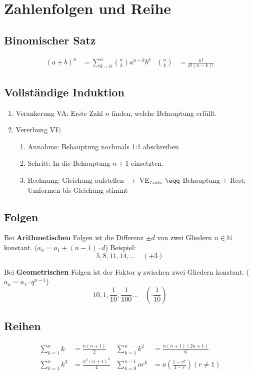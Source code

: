 \section{Zahlenfolgen und Reihe}

\subsection{Binomischer Satz }
\begin{align*}
	(a+b)^n &= \sum_{k=0}^n \binom{n}{k} a^{n-k} b^k
	&
	\binom{n}{k} &= \frac{n!}{k!(n-k)!}
\end{align*}

\subsection{Vollständige Induktion}\label{induktion}
\begin{enumerate}[nosep]
	\item Verankerung VA: Erste Zahl $n$ finden, welche Behauptung erfüllt.
	\item Vererbung VE:
	\begin{enumerate}
		\item Annahme: Behauptung nochmals 1:1 abschreiben
		\item Schritt: In die Behauptung $n+1$ einsetzten.
		\item Rechnung: Gleichung aufstellen $\rightarrow$ VE$_{Links}$ $\eqq$ Behauptung + Rest; Umformen bis Gleichung stimmt
	\end{enumerate}

\end{enumerate}

\subsection{Folgen}
\noindent Bei \textbf{Arithmetischen} Folgen ist die Differenz $\pm d$ von zwei Gliedern $n \in \mathbb{N}$ konstant. ($a_n = a_1 + (n - 1) \cdot d$) Beispiel:
\[5,8,11,14,\dots \quad (+3)\]

\noindent Bei \textbf{Geometrischen} Folgen ist der Faktor $q$ zwischen zwei Gliedern konstant. ($a_n = a_1 \cdot q^{n-1}$)
\[10, 1, \frac{1}{10}, \frac{1}{100}\dots \quad (\cdot \frac{1}{10})\]


\subsection{Reihen }
\begin{align*}
	\sum_{k=1}^n k   &= \frac{n(n+1)}{2} &
	\sum_{k=1}^n k^2 &= \frac{n(n+1)(2n+1)}{6} \\
	\sum_{k=1}^n k^3 &= \frac{n^2(n+1)^2}{4} &
	\sum_{k=0}^{n-1} ar^k &= a\left(\frac{1-r^n}{1-r}\right) (r \neq 1)
\end{align*}
